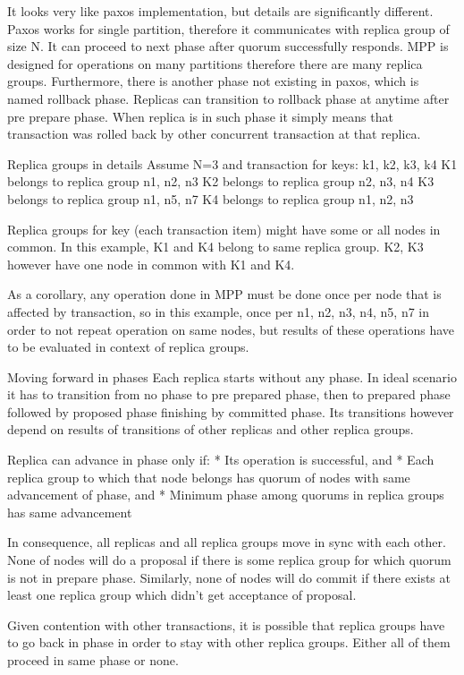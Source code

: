 It looks very like paxos implementation, but details are significantly different. 
Paxos works for single partition, therefore it communicates with replica group of size N. It can proceed to next phase after quorum successfully responds. 
MPP is designed for operations on many partitions therefore there are many replica groups. 
Furthermore, there is another phase not existing in paxos, which is named rollback phase. Replicas can transition to rollback phase at anytime after pre prepare phase. When replica is in such phase it simply means that transaction was rolled back by other concurrent transaction at that replica. 


        Replica groups in details
Assume N=3 and transaction for keys: k1, k2, k3, k4 
K1 belongs to replica group n1, n2, n3
K2 belongs to replica group n2, n3, n4
K3 belongs to replica group n1, n5, n7
K4 belongs to replica group n1, n2, n3


Replica groups for key (each transaction item) might have some or all nodes in common.
In this example, K1 and K4 belong to same replica group. K2, K3 however have one node in common with K1 and K4.


As a corollary, any operation done in MPP must be done once per node that is affected by transaction, so in this example, once per n1, n2, n3, n4, n5, n7 in order to not repeat operation on same nodes, but results of these operations have to be evaluated in context of replica groups. 


        Moving forward in phases
Each replica starts without any phase. In ideal scenario it has to transition from no phase to pre prepared phase, then to prepared phase followed by proposed phase finishing by committed phase. Its transitions however depend on results of transitions of other replicas and other replica groups.


Replica can advance in phase only if:
* Its operation is successful, and
* Each replica group to which that node belongs has quorum of nodes with same advancement of phase, and
* Minimum phase among quorums in replica groups has same advancement


In consequence, all replicas and all replica groups move in sync with each other. None of nodes will do a proposal if there is some replica group for which quorum is not in prepare phase. Similarly, none of nodes will do commit if there exists at least one replica group which didn’t get acceptance of proposal.


Given contention with other transactions, it is possible that replica groups have to go back in phase in order to stay with other replica groups. Either all of them proceed in same phase or none.


